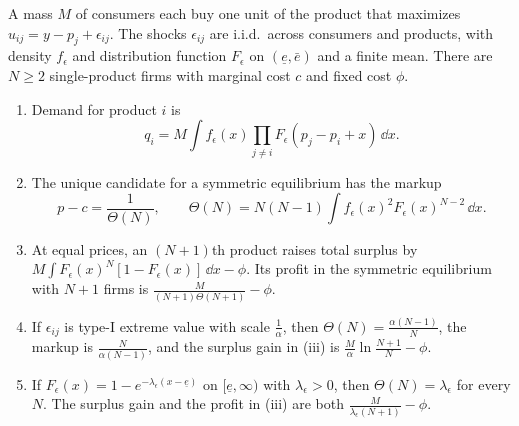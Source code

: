 \begin{proposition}\label{prop:04-adn}
A mass $M$ of consumers each buy one unit of the product that maximizes $u_{ij} = y - p_j + \epsilon_{ij}$. The shocks
$\epsilon_{ij}$ are i.i.d.\ across consumers and products, with density $f_\epsilon$ and distribution function $F_\epsilon$
on $(\underline e, \bar e)$ and a finite mean. There are $N \ge 2$ single-product firms with marginal cost $c$ and
fixed cost $\phi$.
\begin{enumerate}[label=(\roman*)]
\item Demand for product $i$ is
\begin{equation}\label{eq:04-adn-demand}
q_i = M\int f_\epsilon(x)\prod_{j \ne i}F_\epsilon(p_j - p_i + x)\,\dd x .
\end{equation}
\item The unique candidate for a symmetric equilibrium has the markup
\begin{equation}\label{eq:04-adn-markup}
p - c = \frac{1}{\Theta(N)}, \qquad \Theta(N) = N(N - 1)\int f_\epsilon(x)^2F_\epsilon(x)^{N-2}\,\dd x .
\end{equation}
\item At equal prices, an $(N+1)$th product raises total surplus by $M\int F_\epsilon(x)^N[1 - F_\epsilon(x)]\,\dd x - \phi$.
Its profit in the symmetric equilibrium with $N + 1$ firms is $\frac{M}{(N + 1)\Theta(N + 1)} - \phi$.
\item If $\epsilon_{ij}$ is type-I extreme value with scale $\frac{1}{\alpha}$, then $\Theta(N) = \frac{\alpha(N - 1)}{N}$,
the markup is $\frac{N}{\alpha(N - 1)}$, and the surplus gain in (iii) is $\frac{M}{\alpha}\ln\frac{N + 1}{N} - \phi$.
\item If $F_\epsilon(x) = 1 - e^{-\lambda_\epsilon(x - \underline e)}$ on $[\underline e, \infty)$ with $\lambda_\epsilon > 0$,
then $\Theta(N) = \lambda_\epsilon$ for every $N$. The surplus gain and the profit in (iii) are both
$\frac{M}{\lambda_\epsilon(N + 1)} - \phi$.
\end{enumerate}
\end{proposition}

